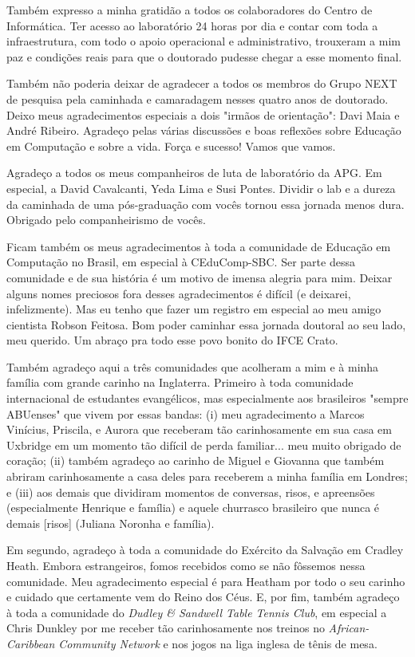 \begin{agradecimentos}
Também expresso a minha gratidão a todos os colaboradores do Centro de Informática. 
Ter acesso ao laboratório 24 horas por dia e contar com toda a infraestrutura, com todo o apoio operacional e administrativo, trouxeram a mim paz e condições reais para que o doutorado pudesse chegar a esse momento final.

Também não poderia deixar de agradecer a todos os membros do Grupo NEXT de pesquisa pela caminhada e camaradagem nesses quatro anos de doutorado. Deixo meus agradecimentos especiais a dois "irmãos de orientação": Davi Maia e André Ribeiro. Agradeço pelas várias discussões e boas reflexões sobre Educação em Computação e sobre a vida. Força e sucesso! Vamos que vamos.

Agradeço a todos os meus companheiros de luta de laboratório da APG. Em especial, a David Cavalcanti, Yeda Lima e Susi Pontes. Dividir o lab e a dureza da caminhada de uma pós-graduação com vocês tornou essa jornada menos dura. Obrigado pelo companheirismo de vocês.

Ficam também os meus agradecimentos à toda a comunidade de Educação em Computação no Brasil, em especial à CEduComp-SBC. Ser parte dessa comunidade e de sua história é um motivo de imensa alegria para mim. Deixar alguns nomes preciosos fora desses agradecimentos é difícil (e deixarei, infelizmente). Mas eu tenho que fazer um registro em especial ao meu amigo cientista Robson Feitosa. Bom poder caminhar essa jornada doutoral ao seu lado, meu querido. Um abraço pra todo esse povo bonito do IFCE Crato.

Também agradeço aqui a três comunidades que acolheram a mim e à minha família com grande carinho na Inglaterra. Primeiro à toda comunidade internacional de estudantes evangélicos, mas especialmente aos brasileiros "sempre ABUenses" que vivem por essas bandas: (i) meu agradecimento a Marcos Vinícius, Priscila, e Aurora que receberam tão carinhosamente em sua casa em Uxbridge em um momento tão difícil de perda familiar... meu muito obrigado de coração; (ii) também agradeço ao carinho de Miguel e Giovanna que também abriram carinhosamente a casa deles para receberem a minha família em Londres; e (iii) aos demais que dividiram momentos de conversas, risos, e apreensões (especialmente Henrique e família) e aquele churrasco brasileiro que nunca é demais [risos] (Juliana Noronha e família).

Em segundo, agradeço à toda a comunidade do Exército da Salvação em Cradley Heath. Embora estrangeiros, fomos recebidos como se não fôssemos nessa comunidade. Meu agradecimento especial é para Heatham por todo o seu carinho e cuidado que certamente vem do Reino dos Céus. E, por fim, também agradeço à toda a comunidade do \textit{Dudley \& Sandwell Table Tennis Club}, em especial a Chris Dunkley por me receber tão carinhosamente nos treinos no \textit{African-Caribbean Community Network} e nos jogos na liga inglesa de tênis de mesa.

\end{agradecimentos}
